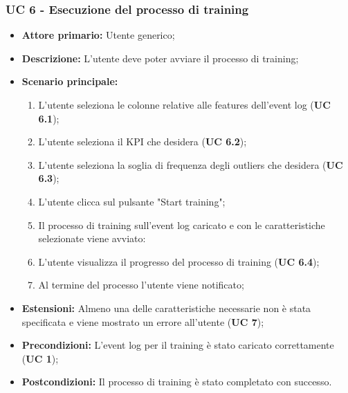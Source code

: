 \subsubsection{UC 6 - Esecuzione del processo di training}
\begin{itemize}
	\item \textbf{Attore primario:} Utente generico;
	\item \textbf{Descrizione:} L'utente deve poter avviare il processo di training;
	\item \textbf{Scenario principale:} 
		\begin{enumerate}
			\item L'utente seleziona le colonne relative alle features dell'event log (\textbf{UC 6.1});
			\item L'utente seleziona il KPI che desidera (\textbf{UC 6.2});		
			\item L'utente seleziona la soglia di frequenza degli outliers che desidera (\textbf{UC 6.3});
			\item L'utente clicca sul pulsante "Start training";
			\item Il processo di training sull'event log caricato e con le caratteristiche selezionate viene avviato:
			\item L'utente visualizza il progresso del processo di training (\textbf{UC 6.4}); 
			\item Al termine del processo l'utente viene notificato;
		\end{enumerate}
	\item \textbf{Estensioni:} Almeno una delle caratteristiche necessarie non è stata specificata e viene mostrato un errore all'utente (\textbf{UC 7});
	\item \textbf{Precondizioni:} L'event log per il training è stato caricato correttamente (\textbf{UC 1});
	\item \textbf{Postcondizioni:} Il processo di training è stato completato con successo. 

\end{itemize}


